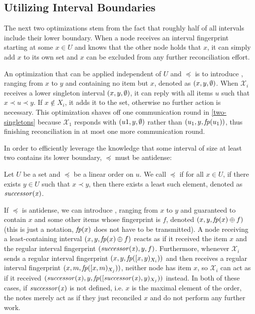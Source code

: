 \subsection{Utilizing Interval Boundaries}
\label{utilizing-boundaries}

The next two optimizations stem from the fact that roughly half of all intervals include their lower boundary. When a node receives an interval fingerprint starting at some $x \in U$ and knows that the other node holds that $x$, it can simply add $x$ to its own set and $x$ can be excluded from any further reconciliation effort.

An optimization that can be applied independent of $U$ and $\preceq$ is to introduce , ranging from $x$ to $y$ and containing no item but $x$, denoted as $({x}, {y}, {\emptyset})$. When $\mathcal{X}_i$ receives a lower singleton interval $({x}, {y}, {\emptyset})$, it can reply with all items $u$ such that $x \prec u \prec y$. If $x \notin X_i$, it adds it to the set, otherwise no further action is necessary. This optimization shaves off one communication round in \cref{two-singletons} because $\mathcal{X}_1$ responds with $({u1}, {y}, {\emptyset})$ rather than $({u_1}, {y}, {\mathit{fp}(u_1)})$, thus finishing reconciliation in at most one more communication round.

In order to efficiently leverage the knowledge that some interval of size at least two contains its lower boundary, $\preceq$ must be antidense:

\begin{definition}
Let $U$ be a set and $\preceq$ be a linear order on $u$. We call $\preceq$  if for all $x \in U$, if there exists $y \in U$ such that $x \prec y$, then there exists a least such element, denoted as $\mathit{successor({x})}$.
\end{definition}

If $\preceq$ is antidense, we can introduce , ranging from $x$ to $y$ and guaranteed to contain $x$ and some other items whose fingerprint is $f$, denoted $({x}, {y}, {{\mathit{fp}(x)} \oplus {f}})$ (this is just a notation, $\mathit{fp}(x)$ does not have to be transmitted). A node receiving a least-containing interval $({x}, {y}, {{\mathit{fp}(x)} \oplus {f}})$ reacts as if it received the item $x$ and the regular interval fingerprint $({\mathit{successor({x})}}, {y}, {f})$. Furthermore, whenever $\mathcal{X}_i$ sends a regular interval fingerprint $({x}, {y}, {\mathit{fp}([{x},{y})_{X_i})})$ and then receives a regular interval fingerprint $({x}, {m}, {\mathit{fp}([{x},{m})_{X_j})})$, neither node has item $x$, so $\mathcal{X}_i$ can act as if it received $({\mathit{successor({x})}}, {y}, {\mathit{fp}([{\mathit{successor({x})}},{y})_{X_j})})$ instead.
In both of these cases, if $\mathit{successor({x})}$ is not defined, i.e. $x$ is the maximal element of the order, the notes merely act as if they just reconciled $x$ and do not perform any further work.

